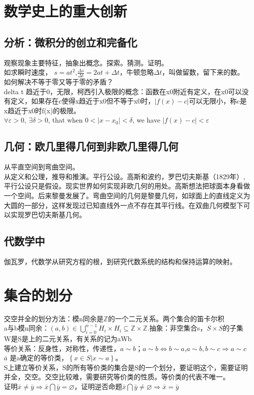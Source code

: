 \documentclass[UTF8]{article}
\begin{document}
\section{数学史上的重大创新}
\subsection{分析：微积分的创立和完备化}
观察现象主要特征，抽象出概念。探索。猜测。证明。\\
如求瞬时速度， $s=at^2$,$\frac{\Delta s}{\Delta t}=2at+\Delta t$，牛顿忽略$\Delta t$，叫做留数，留下来的数。\\
如何解决不等于零又等于零的矛盾？\\
delta t 趋近于0，无限，柯西引入极限的概念：函数在x0附近有定义，在x0可以没有定义，如果存在c使得x趋近于x0但不等于x0时，$|f(x)-c|$可以无限小，称c是x趋近于x0时f(x)的极限。\\
$\forall \varepsilon >0,\ \exists \delta >0$, that when $0<|x-x_0|<\delta$, we have $|f(x)-c|<\varepsilon$
\subsection{几何：欧几里得几何到非欧几里得几何}
从平直空间到弯曲空间。\\
从定义和公理，推导和推演。平行公设。高斯和波约，罗巴切夫斯基（1829年）,平行公设只是假设。现实世界如何实现非欧几何的用处。高斯想法把球面本身看做一个空间。后来黎曼发展了。弯曲空间的几何是黎曼几何，如球面上的直线定义为大圆的一部分，这样发现过已知直线外一点不存在其平行线。在双曲几何模型下可以实现罗巴切夫斯基几何。\\
\subsection{代数学中}
伽瓦罗，代数学从研究方程的根，到研究代数系统的结构和保持运算的映射。
\section{集合的划分}
交空并全的划分方法：模n同余是$\mathbb Z$的一个二元关系。两个集合的笛卡尔积\\
a与b模n同余：$(a,b) \in \bigcup _{i=0}^{n-1} H_i \times H_i \subseteq \mathbb Z \times \mathbb Z$.抽象：非空集合s，$S\times S$的子集W是S是上的二元关系，有关系的记为aWb\\
等价关系：反身性，对称性，传递性，$a \sim b$；$a \sim b \Leftrightarrow b \sim a$,$a \sim b,b \sim c \Rightarrow a \sim c$\\
$\bar a$ 是a确定的等价类，$\left\{ x \in S |x \sim a \right\}$。\\
S上建立等价关系，S的所有等价类的集合是S的一个划分，要证明这个，需要证明并全，交空。交空比较难，需要研究等价类的性质。等价类的代表不唯一。\\
证明$\bar x \neq \bar y \Rightarrow \bar x \bigcap \bar y = \varnothing  $，证明逆否命题$ \bar x \bigcap \bar y \neq \varnothing \Rightarrow  \bar x = \bar y$\\
\end{document}
